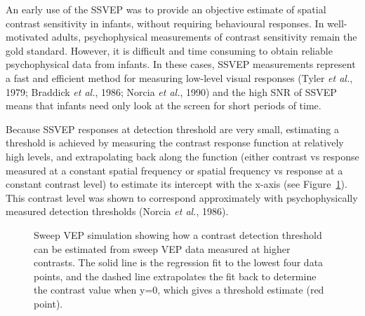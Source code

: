 \documentclass[
  letterpaper,
  DIV=11,
  numbers=noendperiod]{scrartcl}
\begin{document}
An early use of the SSVEP was to provide an objective estimate of
spatial contrast sensitivity in infants, without requiring behavioural
responses. In well-motivated adults, psychophysical measurements of
contrast sensitivity remain the gold standard. However, it is difficult
and time consuming to obtain reliable psychophysical data from infants.
In these cases, SSVEP measurements represent a fast and efficient method
for measuring low-level visual responses (Tyler \emph{et al.}, 1979;
Braddick \emph{et al.}, 1986; Norcia \emph{et al.}, 1990) and the high
SNR of SSVEP means that infants need only look at the screen for short
periods of time.

Because SSVEP responses at detection threshold are very small,
estimating a threshold is achieved by measuring the contrast response
function at relatively high levels, and extrapolating back along the
function (either contrast vs response measured at a constant spatial
frequency or spatial frequency vs response at a constant contrast level)
to estimate its intercept with the x-axis (see
Figure~\ref{fig-sweepvep}). This contrast level was shown to correspond
approximately with psychophysically measured detection thresholds
(Norcia \emph{et al.}, 1986).

\begin{figure}


\caption{\label{fig-sweepvep}Sweep VEP simulation showing how a contrast
detection threshold can be estimated from sweep VEP data measured at
higher contrasts. The solid line is the regression fit to the lowest
four data points, and the dashed line extrapolates the fit back to
determine the contrast value when y=0, which gives a threshold estimate
(red point).}

\end{figure}%
\end{document}
